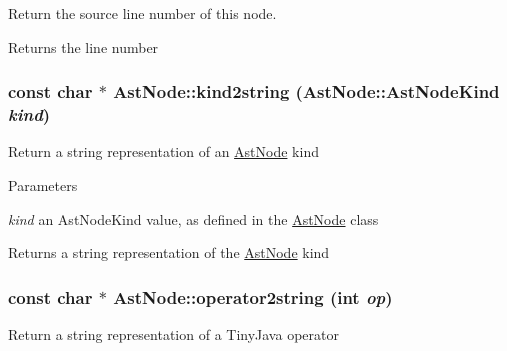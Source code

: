\label{classAstNode_a93ce204950529a50b86813904e03dfd7}
Return the source line number of this node. \begin{DoxyReturn}{Returns}
the line number 
\end{DoxyReturn}
\hypertarget{classAstNode_a9579a36e66ca9449b8aac87f0bf8f832}{
\subsubsection[{kind2string}]{\setlength{\rightskip}{0pt plus 5cm}const char $\ast$ AstNode::kind2string ({\bf AstNode::AstNodeKind} {\em kind})}}
\label{classAstNode_a9579a36e66ca9449b8aac87f0bf8f832}
Return a string representation of an \hyperlink{classAstNode}{AstNode} kind


\begin{DoxyParams}{Parameters}
\item[{\em kind}]an AstNodeKind value, as defined in the \hyperlink{classAstNode}{AstNode} class\end{DoxyParams}
\begin{DoxyReturn}{Returns}
a string representation of the \hyperlink{classAstNode}{AstNode} kind 
\end{DoxyReturn}
\hypertarget{classAstNode_abb3df00672c92269af102f415b9acf62}{
\subsubsection[{operator2string}]{\setlength{\rightskip}{0pt plus 5cm}const char $\ast$ AstNode::operator2string (int {\em op})}}
\label{classAstNode_abb3df00672c92269af102f415b9acf62}
Return a string representation of a TinyJava operator


